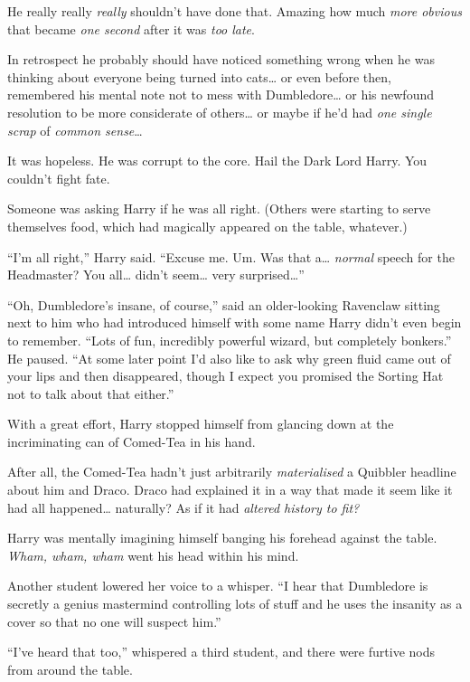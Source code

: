He really really \emph{really} shouldn't have done that. Amazing how
much \emph{more obvious} that became \emph{one second} after it was
\emph{too late}.

In retrospect he probably should have noticed something wrong when he
was thinking about everyone being turned into cats\ldots{} or even
before then, remembered his mental note not to mess with
Dumbledore\ldots{} or his newfound resolution to be more considerate of
others\ldots{} or maybe if he'd had \emph{one single scrap} of
\emph{common sense}\ldots{}

It was hopeless. He was corrupt to the core. Hail the Dark Lord Harry.
You couldn't fight fate.

Someone was asking Harry if he was all right. (Others were starting to
serve themselves food, which had magically appeared on the table,
whatever.)

``I'm all right,'' Harry said. ``Excuse me. Um. Was that a\ldots{}
\emph{normal} speech for the Headmaster? You all\ldots{} didn't
seem\ldots{} very surprised\ldots{}''

``Oh, Dumbledore's insane, of course,'' said an older-looking Ravenclaw
sitting next to him who had introduced himself with some name Harry
didn't even begin to remember. ``Lots of fun, incredibly powerful
wizard, but completely bonkers.'' He paused. ``At some later point I'd
also like to ask why green fluid came out of your lips and then
disappeared, though I expect you promised the Sorting Hat not to talk
about that either.''

With a great effort, Harry stopped himself from glancing down at the
incriminating can of Comed-Tea in his hand.

After all, the Comed-Tea hadn't just arbitrarily \emph{materialised} a
Quibbler headline about him and Draco. Draco had explained it in a way
that made it seem like it had all happened\ldots{} naturally? As if it
had \emph{altered history to fit?}

Harry was mentally imagining himself banging his forehead against the
table. \emph{Wham, wham, wham} went his head within his mind.

Another student lowered her voice to a whisper. ``I hear that Dumbledore
is secretly a genius mastermind controlling lots of stuff and he uses
the insanity as a cover so that no one will suspect him.''

``I've heard that too,'' whispered a third student, and there were
furtive nods from around the table.

